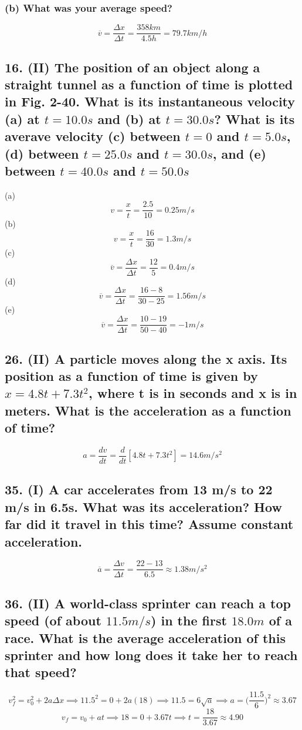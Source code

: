 \documentclass[12pt,a4paper,english]{article}
\begin{document}
\begin{flushleft}
        \subsubsection{(b) What was your average speed?}
        \[ 
          \overline{v}=\frac{\Delta x}{\Delta t}=\frac{358km}{4.5h}=79.7km/h
        \]
      \subsection{16. (II) The position of an object along a straight tunnel as a function of time is plotted in Fig. 2-40. What is its instantaneous velocity (a) at $t=10.0s$ and (b) at $t=30.0s$? What is its averave velocity (c) between $t=0$ and $t=5.0s$, (d) between $t=25.0s$ and $t=30.0s$, and (e) between $t=40.0s$ and $t=50.0s$}
      (a)
      \[
v=\frac{x}{t}=\frac{2.5}{10}=0.25m/s
      \]
      (b)
      \[
v=\frac{x}{t}=\frac{16}{30}=1.3m/s
      \]
      (c)
      \[
        \overline{v}=\frac{\Delta x}{\Delta t}=\frac{12}{5}=0.4m/s
      \]
      (d)
      \[
        \overline{v}=\frac{\Delta x}{\Delta t}=\frac{16-8}{30-25}=1.56m/s
      \]
      (e)
      \[
        \overline{v}=\frac{\Delta x}{\Delta t}=\frac{10-19}{50-40}=-1m/s
      \]
      \subsection{26. (II) A particle moves along the x axis. Its position as a function of time is given by $x=4.8t+7.3t^2$, where t is in seconds and x is in meters. What is the acceleration as a function of time?}
      \[
        a=\frac{dv}{dt}=\frac{d}{dt}[4.8t+7.3t^2]=14.6m/s^2
      \]
      \subsection{35. (I) A car accelerates from 13 m/s to 22 m/s in 6.5s. What was its acceleration? How far did it travel in this time? Assume constant acceleration.}
      \[
        \overline{a}=\frac{\Delta v}{\Delta t}=\frac{22 -13}{6.5}\approx 1.38m/s^2
      \]
      \subsection{36. (II) A world-class sprinter can reach a top speed (of about $11.5m/s$) in the first $18.0m$ of a race. What is the average acceleration of this sprinter and how long does it take her to reach that speed?}
      \[
        v_{f}^2=v_{0}^2+2a\Delta x \implies 11.5^2=0+2a(18) \implies
        11.5=6\sqrt{a}\implies 
        a=\biggr(\frac{11.5}{6}\biggr)^2 \approx 3.67
      \]
      \[
        v_{f}=v_{0}+at\implies 18=0+3.67t\implies 
        t=\frac{18}{3.67}\approx 4.90
      \]

\end{flushleft}
\end{document}
